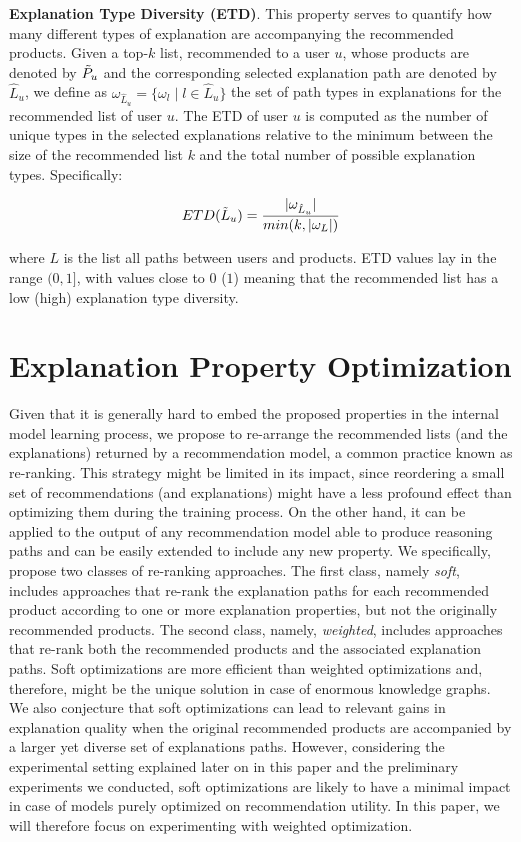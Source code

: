 \documentclass[sigconf]{acmart}
\begin{document}
\vspace{1mm}\noindent\textbf{Explanation Type Diversity (ETD)}. 
This property serves to quantify how many different types of explanation are accompanying the recommended products. 
Given a top-$k$ list, recommended to a user $u$, whose products are denoted by $\Tilde{P}_u$ and the corresponding selected explanation path are denoted by $\hat{L}_{u}$, we define as $\omega_{\hat{L}_{u}} = \{\omega_l \; | \; l \in \hat{L}_{u}\}$ the set of path types in explanations for the recommended list of user $u$. 
The ETD of user $u$ is computed as the number of unique types in the selected explanations relative to the minimum between the size of the recommended list $k$ and the total number of possible explanation types. 
Specifically:

\vspace{-2mm}
\begin{equation}
ETD(\Tilde{L}_u) = \frac{|\omega_{\hat{L}_{u}}|}{min(k, |\omega_{L}|)}
\label{eq:etd}
\end{equation}

where $L$ is the list all paths between users and products.
ETD values lay in the range $(0, 1]$, with values close to $0$ ($1$) meaning that the recommended list has a low (high) explanation type diversity. 

\section{Explanation Property Optimization}\label{sec:algorithm}
Given that it is generally hard to embed the proposed properties in the internal model learning process, we propose to re-arrange the recommended lists (and the explanations) returned by a recommendation model, a common practice known as re-ranking. 
{\color{black}This strategy might be limited in its impact, since reordering a small set of recommendations (and explanations) might have a less profound effect than optimizing them during the training process.}
On the other hand, it can be applied to the output of any recommendation model {\color{black} able to produce reasoning paths} and can be easily extended to include any new property. 
We specifically, propose two classes of re-ranking approaches. 
The first class, namely {\em soft}, includes approaches that re-rank the explanation paths for each recommended product according to one or more explanation properties, but not the originally recommended products. 
The second class, namely, {\em weighted}, includes approaches that re-rank both the recommended products and the associated explanation paths.
{\color{black} Soft optimizations are more efficient than weighted optimizations and, therefore, might be the unique solution in case of enormous knowledge graphs. We also conjecture that soft optimizations can lead to relevant gains in explanation quality when the original recommended products are accompanied by a larger yet diverse set of explanations paths. However, considering the experimental setting explained later on in this paper and the preliminary experiments we conducted, soft optimizations are likely to have a minimal impact in case of models purely optimized on recommendation utility. In this paper, we will therefore focus on experimenting with weighted optimization. }
\end{document}
